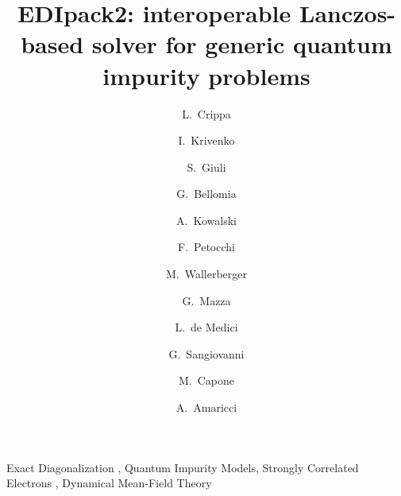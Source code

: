 \documentclass[preprint,3p,10pt]{elsarticle}
\begin{document}
\begin{frontmatter}

\title{EDIpack2: interoperable Lanczos-based solver for generic quantum impurity problems}
\author[a,b,c]{L.~Crippa}
\author[a]{I.~Krivenko}
\author[d]{S.~Giuli}
\author[d]{G.~Bellomia}
 \author[c]{A.~Kowalski}
\author[e]{F.~Petocchi}
 \author[f]{M.~Wallerberger}
 \author[g]{G.~Mazza}
 \author[h]{L.~de Medici}
 \author[c,b]{G.~Sangiovanni}
 \author[d,i]{M.~Capone}
\author[i]{A.~Amaricci}

\newcommand{\CNRIOM}{CNR-IOM, Istituto Officina dei Materiali,
  Consiglio Nazionale delle Ricerche, Via Bonomea 265, 34136
  Trieste, Italy}
\newcommand{\SISSA}{Scuola Internazionale Superiore di Studi Avanzati (SISSA),
  Via Bonomea 265, 34136 Trieste, Italy}
\newcommand{\ITPHamburg}{I. Institute of Theoretical Physics,
  University of Hamburg, Notkestrasse 9, 22607 Hamburg, Germany}
\newcommand{\WZBURG}{Institut f\"ur Theoretische Physik und
  Astrophysik,Universit\"at W\"urzburg, 97074 W\"urzburg, Germany}
\newcommand{\CTQMAT}{W\"urzburg-Dresden Cluster of Excellence ct.qmat, 01062 Dresden, Germany}
\newcommand{\Geneve}{Department of Quantum Matter Physics, University of
  Geneva, Quai Ernest-Ansermet 24, 1211 Geneva, Switzerland}
\newcommand{\UPISA}{Department of Physics ``E. Fermi'' University of
  Pisa, Largo B. Pontecorvo 3, 56127 Pisa, Italy}
\newcommand{\ESPCI}{LPEM, ESPCI Paris, PSL Research University, CNRS, Sorbonne Universit\'e, 75005 Paris, France}
\newcommand{\TUW}{Institure of Solid State Physics, TU Wien, 1040 Vienna, Austria}

\address[a]{\ITPHamburg}
\address[b]{\CTQMAT}
\address[c]{\WZBURG}
\address[d]{\SISSA}
\address[e]{\Geneve}
\address[f]{\TUW}
\address[g]{\UPISA}
\address[h]{\ESPCI}
\address[i]{\CNRIOM}

\begin{abstract}
  
\end{abstract}

\begin{keyword}
  Exact Diagonalization \sep
  Quantum Impurity Models\sep  
  Strongly Correlated Electrons \sep  
  Dynamical Mean-Field Theory
\end{keyword}

\end{frontmatter}
\end{document}
